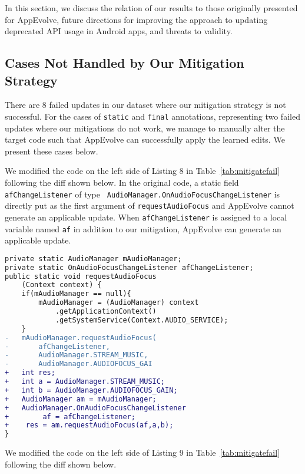 In this section, we discuss the relation of our
results to those originally presented for AppEvolve, future directions for improving the
approach to updating deprecated API usage in Android apps, and threats to validity.

\subsection{Cases Not Handled by Our Mitigation Strategy}

There are 8 failed updates in our dataset where our mitigation
strategy is not successful. For the cases of {\tt static} and {\tt final}
annotations, representing two failed updates where our mitigations do not
work, we manage to manually alter the target code such that AppEvolve can
successfully apply the learned edits. We present these cases below.

We modified the code on the left side of Listing 8 in
Table~\ref{tab:mitigatefail} following the diff shown below. In the
original code, a static field {\tt afChangeListener} of type {\tt
  Audio\-Manager.OnAudioFocusChangeListener} is directly put as the first
argument of {\tt requestAudioFocus} and AppEvolve cannot generate an
applicable update. When {\tt afChangeListener} is assigned to a local
variable named {\tt af} in addition to our mitigation, AppEvolve can
generate an applicable update. 


\begin{lstlisting}[language=diff,numbers=none]
private static AudioManager mAudioManager;
private static OnAudioFocusChangeListener afChangeListener;
public static void requestAudioFocus
    (Context context) {
    if(mAudioManager == null){
        mAudioManager = (AudioManager) context
            .getApplicationContext()
            .getSystemService(Context.AUDIO_SERVICE);
    }
-   mAudioManager.requestAudioFocus(
-       afChangeListener,
-       AudioManager.STREAM_MUSIC,
-       AudioManager.AUDIOFOCUS_GAI
+   int res;
+   int a = AudioManager.STREAM_MUSIC;
+   int b = AudioManager.AUDIOFOCUS_GAIN;
+   AudioManager am = mAudioManager;
+   AudioManager.OnAudioFocusChangeListener
+        af = afChangeListener;
+    res = am.requestAudioFocus(af,a,b);
}
\end{lstlisting}

\vspace{\baselineskip}

We modified the code on the left side of Listing 9 in
Table~\ref{tab:mitigatefail} following the diff shown below.

